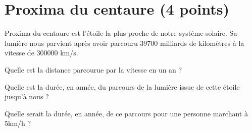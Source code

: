 \section{Proxima du centaure (4 points)}

Proxima du centaure est l'étoile la plus proche de notre système solaire. Sa lumière nous parvient après avoir parcouru \num{39700} milliards de kilomètres à la vitesse de \num{300000} km/s.

\begin{questions}
	\question[1] Quelle est la distance parcourue par la vitesse en un an ?
	
	
	\question[1] Quelle est la durée, en année, du parcours de la lumière issue de cette étoile jusqu'à nous ?
	
	\question[2] Quelle serait la durée, en année, de ce parcours pour une personne marchant à 5km/h ?
\end{questions}